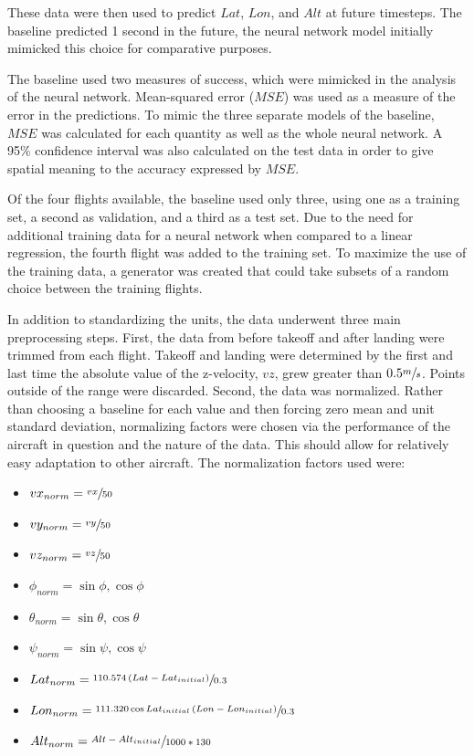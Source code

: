 \documentclass[10pt]{IEEEtran}
\begin{document}
These data were then used to predict $Lat$, $Lon$, and $Alt$ at future timesteps. The baseline predicted 1 second in the future, the neural network model initially mimicked this choice for comparative purposes. 

The baseline used two measures of success, which were mimicked in the analysis of the neural network. Mean-squared error ($MSE$) was used as a measure of the error in the predictions. To mimic the three separate models of the baseline, $MSE$ was calculated for each quantity as well as the whole neural network. A 95\% confidence interval was also calculated on the test data in order to give spatial meaning to the accuracy expressed by $MSE$.

Of the four flights available, the baseline used only three, using one as a training set, a second as validation, and a third as a test set. Due to the need for additional training data for a neural network when compared to a linear regression, the fourth flight was added to the training set. To maximize the use of the training data, a generator was created that could take subsets of a random choice between the training flights.

In addition to standardizing the units, the data underwent three main preprocessing steps. First, the data from before takeoff and after landing were trimmed from each flight. Takeoff and landing were determined by the first and last time the absolute value of the z-velocity, $vz$, grew greater than $0.5 \sfrac{m}{s}$. Points outside of the range were discarded. Second, the data was normalized. Rather than choosing a baseline for each value and then forcing zero mean and unit standard deviation, normalizing factors were chosen via the performance of the aircraft in question and the nature of the data. This should allow for relatively easy adaptation to other aircraft. The normalization factors used were:

\begin{itemize}
    \item $vx_{norm} = \sfrac{vx}{50} $
    \item $vy_{norm} = \sfrac{vy}{50} $
    \item $vz_{norm} = \sfrac{vz}{50} $
    \item $\phi_{norm} = \sin\phi , \cos\phi$
    \item $\theta_{norm} = \sin\theta, \cos\theta$
    \item $\psi_{norm} = \sin\psi, \cos\psi$
    \item $Lat_{norm} = \sfrac{110.574\left(Lat-Lat_{initial}\right)}{0.3}$
    \item $Lon_{norm} = \sfrac{111.320\cos Lat_{initial}\left(Lon-Lon_{initial}\right)}{0.3}$
    \item $Alt_{norm} = \sfrac{Alt-Alt_{initial}}{1000 * 130}$
\end{itemize}
\end{document}
